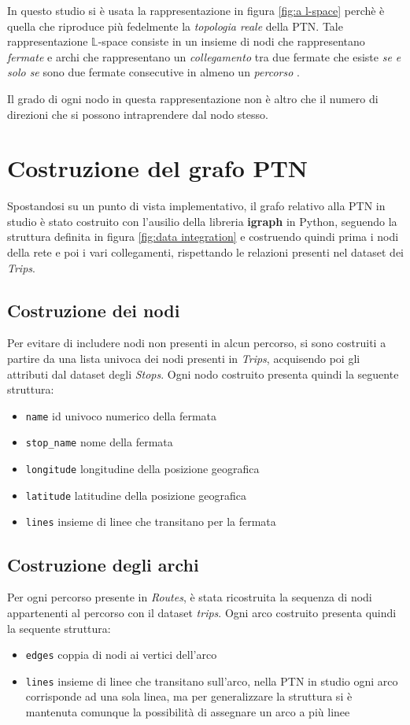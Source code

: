 In questo studio si è usata la rappresentazione in figura \ref{fig:a l-space} perchè è quella che riproduce più fedelmente la \textit{topologia reale} della PTN. Tale rappresentazione $\mathbb{L}$-space consiste in un insieme di nodi che rappresentano \textit{fermate} e archi che rappresentano un \textit{collegamento} tra due fermate che esiste \textit{se e solo se} sono due fermate consecutive in almeno un \textit{percorso} \cite{vonFerber2012LondonParis}.

Il grado di ogni nodo in questa rappresentazione non è altro che il numero di direzioni \cite{SienkiewiczHolyst2005} che si possono intraprendere dal nodo stesso.

\section{Costruzione del grafo PTN}
Spostandosi su un punto di vista implementativo, il grafo relativo alla PTN in studio è stato costruito con l'ausilio della libreria \textbf{igraph} \cite{igraph} in Python, seguendo la struttura definita in figura \ref{fig:data integration} e costruendo quindi prima i nodi della rete e poi i vari collegamenti, rispettando le relazioni presenti nel dataset dei \textit{Trips}.

\subsection{Costruzione dei nodi}
Per evitare di includere nodi non presenti in alcun percorso, si sono costruiti a partire da una lista univoca dei nodi presenti in \textit{Trips}, acquisendo poi gli attributi dal dataset degli \textit{Stops}. Ogni nodo costruito presenta quindi la seguente struttura:
\begin{itemize}
    \item \texttt{name} id univoco numerico della fermata
    \item \texttt{stop\_name} nome della fermata
    \item \texttt{longitude} longitudine della posizione geografica
    \item \texttt{latitude} latitudine della posizione geografica
    \item \texttt{lines} insieme di linee che transitano per la fermata
\end{itemize}

\subsection{Costruzione degli archi}
Per ogni percorso presente in \textit{Routes}, è stata ricostruita la sequenza di nodi appartenenti al percorso con il dataset \textit{trips}. Ogni arco costruito presenta quindi la sequente struttura:
\begin{itemize}
    \item \texttt{edges} coppia di nodi ai vertici dell'arco
    \item \texttt{lines} insieme di linee che transitano sull'arco, nella PTN in studio ogni arco corrisponde ad una sola linea, ma per generalizzare la struttura si è mantenuta comunque la possibilità di assegnare un arco a più linee
\end{itemize}

